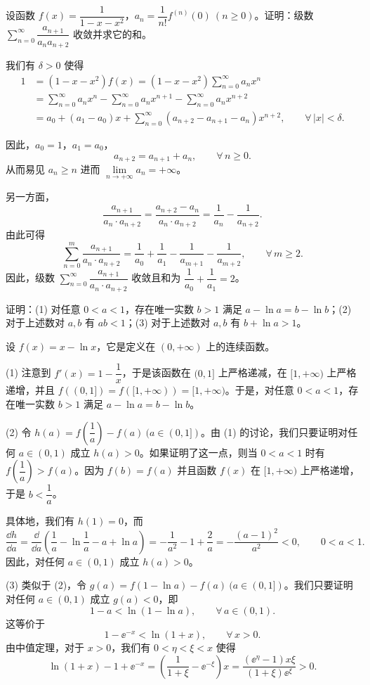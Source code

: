 设函数 $f(x)=\dfrac{1}{1-x-x^2}$，$a_n=\dfrac{1}{n!}f^{(n)}(0)\ (n\geqslant 0)$。证明：级数 $\sum\limits_{n=0}^{\infty}\dfrac{a_{n+1}}{a_na_{n+2}}$ 收敛并求它的和。
\begin{solution}
我们有 $\delta>0$ 使得
\begin{align*}
1&=(1-x-x^2)f(x)=(1-x-x^2)\sum_{n=0}^{\infty}a_nx^n\\
&=\sum_{n=0}^{\infty}a_nx^n-\sum_{n=0}^{\infty}a_nx^{n+1}-\sum_{n=0}^{\infty}a_nx^{n+2}\\
&=a_0+(a_1-a_0)x+\sum_{n=0}^{\infty}(a_{n+2}-a_{n+1}-a_n)x^{n+2},\qquad \forall\,|x|<\delta.
\end{align*}

因此，$a_0=1$，$a_1=a_0$，
\[
a_{n+2}=a_{n+1}+a_n,\qquad \forall\,n\geqslant 0.
\]
从而易见 $a_n\geqslant n$ 进而 $\lim\limits_{n\to+\infty}a_n=+\infty$。

另一方面，
\[
\frac{a_{n+1}}{a_n\cdot a_{n+2}}=\frac{a_{n+2}-a_n}{a_n\cdot a_{n+2}}=\frac{1}{a_n}-\frac{1}{a_{n+2}}.
\]
由此可得
\[
\sum_{n=0}^{m}\frac{a_{n+1}}{a_n\cdot a_{n+2}}=\frac{1}{a_0}+\frac{1}{a_1}-\frac{1}{a_{m+1}}-\frac{1}{a_{m+2}},\qquad \forall\,m\geqslant 2.
\]
因此，级数 $\sum\limits_{n=0}^{\infty}\dfrac{a_{n+1}}{a_n\cdot a_{n+2}}$ 收敛且和为 $\dfrac{1}{a_0}+\dfrac{1}{a_1}=2$。
\end{solution}

证明：(1) 对任意 $0<a<1$，存在唯一实数 $b>1$ 满足 $a-\ln a=b-\ln b$；(2) 对于上述数对 $a,b$ 有 $ab<1$；(3) 对于上述数对 $a,b$ 有 $b+\ln a>1$。
\begin{solution}
设 $f(x)=x-\ln x$，它是定义在 $(0,+\infty)$ 上的连续函数。

(1) 注意到 $f'(x)=1-\dfrac{1}{x}$，于是该函数在 $(0,1]$ 上严格递减，在 $[1,+\infty)$ 上严格递增，并且 $f((0,1])=f([1,+\infty))=[1,+\infty)$。于是，对任意 $0<a<1$，存在唯一实数 $b>1$ 满足 $a-\ln a=b-\ln b$。

(2) 令 $h(a)=f\left(\dfrac{1}{a}\right)-f(a)\ (a\in(0,1])$。由 (1) 的讨论，我们只要证明对任何 $a\in(0,1)$ 成立 $h(a)>0$。如果证明了这一点，则当 $0<a<1$ 时有 $f\left(\dfrac{1}{a}\right)>f(a)$。因为 $f(b)=f(a)$ 并且函数 $f(x)$ 在 $[1,+\infty)$ 上严格递增，于是 $b<\dfrac{1}{a}$。

具体地，我们有 $h(1)=0$，而
\[
\frac{\dd h}{\dd a}=\frac{\dd}{\dd a}\left(\frac{1}{a}-\ln\frac{1}{a}-a+\ln a\right)=-\frac{1}{a^2}-1+\frac{2}{a}=-\frac{(a-1)^2}{a^2}<0,\qquad 0<a<1.
\]
因此，对任何 $a\in(0,1)$ 成立 $h(a)>0$。

(3) 类似于 (2)，令 $g(a)=f(1-\ln a)-f(a)\ (a\in(0,1])$。我们只要证明对任何 $a\in(0,1)$ 成立 $g(a)<0$，即
\[
1-a<\ln(1-\ln a),\qquad \forall\,a\in(0,1).
\]
这等价于
\[
1-\ee^{-x}<\ln(1+x),\qquad \forall\,x>0.
\]
由中值定理，对于 $x>0$，我们有 $0<\eta<\xi<x$ 使得
\[
\ln(1+x)-1+\ee^{-x}=\left(\frac{1}{1+\xi}-\ee^{-\xi}\right)x=\frac{(\ee^{\eta}-1)x\xi}{(1+\xi)\ee^{\xi}}>0.
\]
\end{solution}
